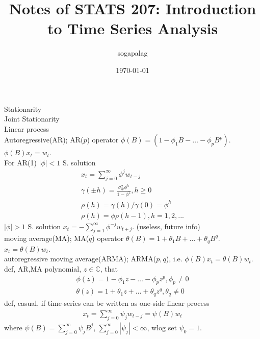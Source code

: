 \documentclass[paper=a4, fontsize=11pt]{scrartcl} %
\title{Notes of STATS 207: Introduction to Time Series Analysis}
\author{sogapalag}
\date{\normalsize\today}
\numberwithin{equation}{section} %
\numberwithin{figure}{section} %
\numberwithin{table}{section} %
\begin{document}
\maketitle
Stationarity\\
Joint Stationarity\\
Linear process\\
Autoregressive(AR); AR($p$) operator $\phi(B)=(1-\phi_1B-\dots-\phi_p B^p)$. $\phi(B)x_t=w_t$.\\
For AR(1) $|\phi|<1$ S. solution
\begin{align}
	x_t = \sum_{j=0}^\infty \phi^j w_{t-j}\\
	\gamma(\pm h) = \frac{\sigma_w^2 \phi^h}{1-\phi^2}, h\geq 0\\
	\rho(h) = \gamma(h)/\gamma(0) = \phi^h\\
	\rho(h) = \phi \rho(h-1), h=1,2,...
\end{align}
$|\phi|>1$ S. solution $x_t=-\sum_{j=1}^\infty \phi^{-j}w_{t+j}$. (useless, future info)\\
moving average(MA); MA($q$) operator $\theta(B)=1+\theta_1 B+\dots+\theta_q B^q$. $x_t=\theta(B)w_t$.\\
autoregressive moving average(ARMA); ARMA($p,q$), i.e. $\phi(B)x_t=\theta(B)w_t$.\\
def, AR,MA polynomial, $z\in\mathbb{C}$, that
\begin{align}
	\phi(z) = 1 -\phi_1 z - \dots - \phi_p z^p, \phi_p\neq 0\\
	\theta(z) = 1 + \theta_1 z + \dots + \theta_q z^q, \theta_q \neq 0
\end{align}
def, casual, if time-series can be written as one-side linear process
\begin{align}
	x_t = \sum_{j=0}^\infty \psi_j w_{t-j} =\psi(B)w_t
\end{align}
where $\psi(B)=\sum_{j=0}^\infty \psi_jB^j$, $\sum_{j=0}^\infty |\psi_j|<\infty$, wlog set $\psi_0=1$.\\
\end{document}

